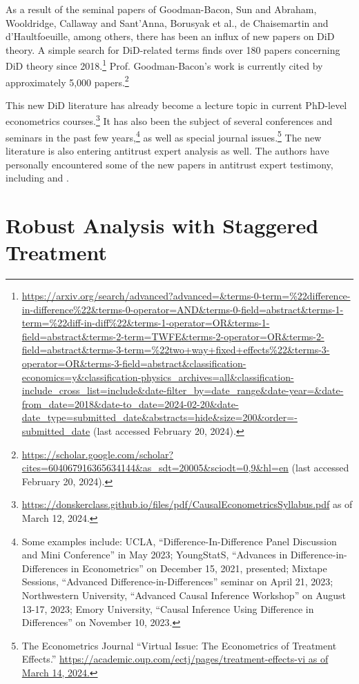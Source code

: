 \documentclass[12pt]{article}
\begin{document}
As a result of the seminal papers of Goodman-Bacon, Sun and Abraham, Wooldridge, Callaway and Sant’Anna, Borusyak et al., de Chaisemartin and d’Haultfoeuille, among others, there has been an influx of new papers on DiD theory. A simple search for DiD-related terms finds over 180 papers concerning DiD theory since 2018.\footnote{\url{https://arxiv.org/search/advanced?advanced=&terms-0-term=\%22difference-in-difference\%22&terms-0-operator=AND&terms-0-field=abstract&terms-1-term=\%22diff-in-diff\%22&terms-1-operator=OR&terms-1-field=abstract&terms-2-term=TWFE&terms-2-operator=OR&terms-2-field=abstract&terms-3-term=\%22two+way+fixed+effects\%22&terms-3-operator=OR&terms-3-field=abstract&classification-economics=y&classification-physics_archives=all&classification-include_cross_list=include&date-filter_by=date_range&date-year=&date-from_date=2018&date-to_date=2024-02-20&date-date_type=submitted_date&abstracts=hide&size=200&order=-submitted_date} (last accessed February 20, 2024).}  Prof. Goodman-Bacon’s work is currently cited by approximately 5,000 papers.\footnote{\url{https://scholar.google.com/scholar?cites=604067916365634144&as_sdt=20005&sciodt=0,9&hl=en} (last accessed February 20, 2024).}

This new DiD literature has already become a lecture topic in current PhD-level econometrics courses.\footnote{\url{https://donskerclass.github.io/files/pdf/CausalEconometricsSyllabus.pdf} as of March 12, 2024.}  It has also been the subject of several conferences and seminars in the past few years,\footnote{Some examples include: UCLA, “Difference-In-Difference Panel Discussion and Mini Conference” in May 2023; YoungStatS, “Advances in Difference-in-Differences in Econometrics” on December 15, 2021, presented; Mixtape Sessions, “Advanced Difference-in-Differences” seminar on April 21, 2023; Northwestern University, “Advanced Causal Inference Workshop” on August 13-17, 2023; Emory University, “Causal Inference Using Difference in Differences” on November 10, 2023.} as well as special journal issues.\footnote{The Econometrics Journal “Virtual Issue: The Econometrics of Treatment Effects.” \url{https://academic.oup.com/ectj/pages/treatment-effects-vi as of March 14, 2024.}} The new literature is also entering antitrust expert analysis as well. The authors have personally encountered some of the new papers in antitrust expert testimony, including \citet{CS2021} and \citet{goodman-bacon2021a}.

\section{Robust Analysis with Staggered Treatment} \label{sec:equations}
\end{document}
